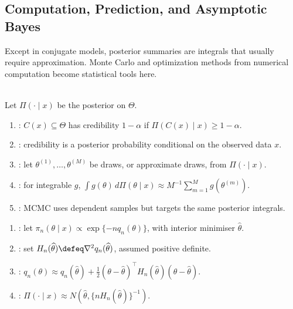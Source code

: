 \subsection{Computation, Prediction, and Asymptotic Bayes}

Except in conjugate models, posterior summaries are integrals that usually require approximation.  Monte Carlo and optimization methods from numerical computation become statistical tools here.

\begin{definition} \label{def:bayesian-credible-set} \label{def:mcmc-posterior-integration} \\
Let $\Pi(\cdot\mid x)$ be the posterior on $\Theta$.
\begin{enumerate}[label=(\roman*)]
\setlength{\itemsep}{0pt}
\item {}: $C(x)\subseteq\Theta$ has credibility $1-\alpha$ if $\Pi(C(x)\mid x)\geq1-\alpha$.
\item {}: credibility is a posterior probability conditional on the observed data $x$.
\item {}: let $\theta^{(1)},\ldots,\theta^{(M)}$ be draws, or approximate draws, from $\Pi(\cdot\mid x)$.
\item {}: for integrable $g$, $\int g(\theta)\,d\Pi(\theta\mid x)\approx M^{-1}\sum_{m=1}^Mg(\theta^{(m)})$.
\item {}: MCMC uses dependent samples but targets the same posterior integrals.
\end{enumerate}
\end{definition}

\begin{method} \label{meth:laplace-approximation-posterior} 
\begin{enumerate}[label=(\roman*)]
\setlength{\itemsep}{0pt}
\item {}: let $\pi_n(\theta\mid x)\propto\exp\{-nq_n(\theta)\}$, with interior minimiser $\widehat{\theta}$.
\item {}: set $H_n(\widehat{\theta})\defeq\nabla^2q_n(\widehat{\theta})$, assumed positive definite.
\item {}: $q_n(\theta)\approx q_n(\widehat{\theta})+\frac12(\theta-\widehat{\theta})^\top H_n(\widehat{\theta})(\theta-\widehat{\theta})$.
\item {}: $\Pi(\cdot\mid x)\approx N(\widehat{\theta},\{nH_n(\widehat{\theta})\}^{-1})$.
\end{enumerate}
\end{method}


